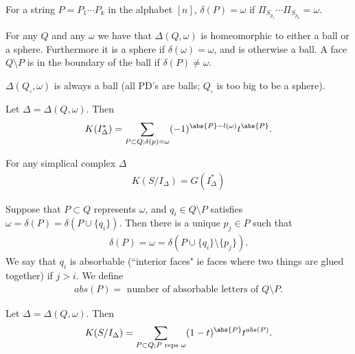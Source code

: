 For a string $P = P_1 \cdots P_k$ in the alphabet $[n]$, $\delta (P) = \omega $ if $\Pi_{S_{p_1}} \cdots \Pi_{S_{p_k}} = \omega $.

\begin{theorem}
    For any $Q$ and any $\omega$ we have that $\Delta (Q, \omega) $ is homeomorphic to either a ball or a sphere. Furthermore it is a sphere if $\delta (\omega) = \omega$, and is otherwise a ball. A face $Q \setminus P$ is in the boundary of the ball if $\delta (P) \neq \omega$.
\end{theorem}

\begin{corollary}
    $\Delta (Q_\square , \omega ) $ is always a ball (all PD's are balls; $Q_\square$ is too big to be a sphere).
\end{corollary}

\begin{lemma}
    Let $\Delta = \Delta (Q, \omega)$. Then 
    \begin{align*}
        K( I_\Delta^* ) = \sum_{P \subset Q; \delta (p) = \omega} (-1)^{\abs{P} - l(\omega) } t^{\abs{P}}.
    \end{align*}
\end{lemma}

\begin{theorem}
    For any simplical complex $\Delta$
    \begin{align*}
        K( S/ I_\Delta) = G(I_\Delta^*)
    \end{align*}
\end{theorem}

\begin{definition}
    Suppose that $P \subset Q$ represents $\omega$, and $q_i \in Q \setminus P$ satisfies $\omega = \delta (P) = \delta (P \cup \{ q_i \} )$. Then there is a unique $p_j \in P$ such that
    \begin{align*}
        \delta (P) = \omega = \delta ( P \cup \{ q_i \} \setminus \{ p_j \} ).
    \end{align*}
    We say that $q_i$ is absorbable (``interior faces" ie faces where two things are glued together) if $j > i$. We define
    \begin{align*}
        abs(P) = \text{ number of absorbable letters of $Q \setminus P$}.
    \end{align*}
\end{definition}

\begin{theorem}
    Let $\Delta = \Delta ( Q, \omega)$. Then
    \begin{align*}
        K( S/I_\Delta ) = \sum_{P \subset Q; P \text{ reps } \omega} (1-t)^{\abs{P}} t^{abs(P)}.
    \end{align*}
\end{theorem}

